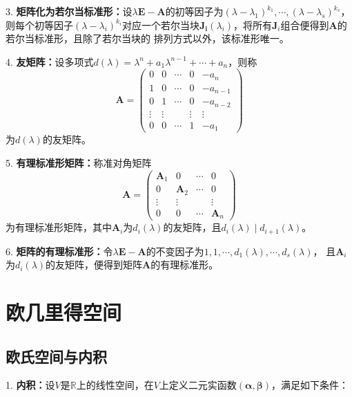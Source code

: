 3. \textbf{矩阵化为若尔当标准形：}设$\lambda\boldsymbol{E}-\boldsymbol{A}$的初等因子为$(\lambda-\lambda_1)^{k_1},\cdots,(\lambda-\lambda_s)^{k_s}$，则每个初等因子$(\lambda-\lambda_i)^{k_i}$对应一个若尔当块$\boldsymbol{J_i}(\lambda_i)$，将所有$\boldsymbol{J}_i$组合便得到$\boldsymbol{A}$的若尔当标准形，且除了若尔当块的
排列方式以外，该标准形唯一。

4. \textbf{友矩阵：}设多项式$d(\lambda)=\lambda^n+a_1\lambda^{n-1}+\cdots+a_n$，则称
\begin{equation*}
    \boldsymbol{A}=\begin{pmatrix}
        0&0&\cdots&0&-a_n\\
        1&0&\cdots&0&-a_{n-1}\\
        0&1&\cdots&0&-a_{n-2}\\
        \vdots&\vdots&&\vdots&\vdots\\
        0&0&\cdots&1&-a_1
    \end{pmatrix}
\end{equation*}
为$d(\lambda)$的友矩阵。

5. \textbf{有理标准形矩阵：}称准对角矩阵
\begin{equation*}
    \boldsymbol{A}=\begin{pmatrix}
        \boldsymbol{A}_1&0&\cdots&0\\
        0&\boldsymbol{A}_2&\cdots&0\\
        \vdots&\vdots&&\vdots\\
        0&0&\cdots&\boldsymbol{A}_n
    \end{pmatrix}
\end{equation*}
为有理标准形矩阵，其中$\boldsymbol{A}_i$为$d_i(\lambda)$的友矩阵，且$d_i(\lambda)\mid d_{i+1}(\lambda)$。

6. \textbf{矩阵的有理标准形：}令$\lambda \boldsymbol{E}-\boldsymbol{A}$的不变因子为$1,1,\cdots,d_1(\lambda),\cdots,d_s(\lambda)$，
且$\boldsymbol{A}_i$为$d_i(\lambda)$的友矩阵，便得到矩阵$\boldsymbol{A}$的有理标准形。

\section{欧几里得空间}

\subsection{欧氏空间与内积}

1. \textbf{内积：}设$V$是$\mathbb{R}$上的线性空间，在$V$上定义二元实函数$(\boldsymbol{\alpha},\boldsymbol{\beta})$，满足如下条件：

